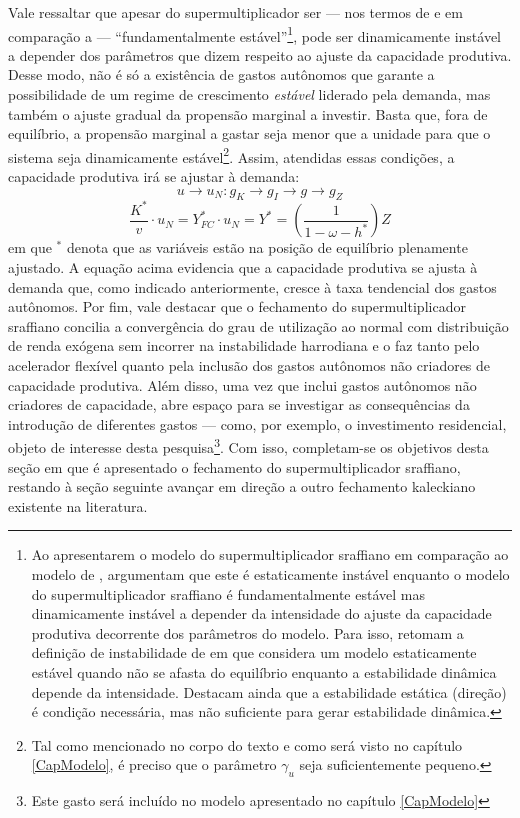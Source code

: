 Vale ressaltar que apesar do supermultiplicador ser --- nos termos de \textcite{hicks_capital_1965} e em comparação a \textcite{harrod_essay_1939} --- ``fundamentalmente estável''\footnote{
	Ao apresentarem o modelo do supermultiplicador sraffiano em comparação ao modelo de \textcite{harrod_essay_1939}, \textcite{serrano_trouble_2017} argumentam que este é estaticamente instável enquanto o modelo do supermultiplicador sraffiano é fundamentalmente estável mas dinamicamente instável a depender da intensidade do ajuste da capacidade produtiva decorrente dos parâmetros do modelo.
	Para isso, retomam a definição de instabilidade de  \textcite{hicks_capital_1965} em que considera um modelo estaticamente estável quando não se afasta do equilíbrio enquanto a estabilidade dinâmica depende da intensidade. Destacam ainda que a estabilidade estática (direção) é condição necessária, mas não suficiente para gerar estabilidade dinâmica.
}, pode ser dinamicamente instável a depender dos parâmetros que dizem respeito ao ajuste da capacidade produtiva. Desse modo, não é só a existência de gastos autônomos que garante a possibilidade de um regime de crescimento \textit{estável} liderado pela demanda, mas também o ajuste gradual da propensão marginal a investir. Basta que, fora de equilíbrio, a propensão marginal a gastar seja menor que a unidade para que o sistema seja dinamicamente estável\footnote{Tal como mencionado no corpo do texto e como será visto no capítulo \ref{CapModelo}, é preciso que o parâmetro $\gamma_u$ seja suficientemente pequeno.}. Assim, atendidas essas condições, a capacidade produtiva irá se ajustar à demanda:
$$
u \to u_N : g_K \to g_I \to g \to  g_Z
$$
$$
\frac{K^*}{v}\cdot u_N = Y_{FC}^*\cdot u_N = Y^* = \left(\frac{1}{1 - \omega - h^*}\right)Z
$$
em que $^*$ denota que as variáveis estão na posição de equilíbrio plenamente ajustado.
A equação acima evidencia que a capacidade produtiva se ajusta à demanda que, como indicado anteriormente, cresce à taxa tendencial dos gastos autônomos. 
Por fim, vale destacar que o fechamento do supermultiplicador sraffiano concilia a convergência do grau de utilização ao normal com distribuição de renda exógena sem incorrer na instabilidade harrodiana e o faz tanto pelo acelerador flexível quanto pela inclusão dos gastos autônomos não criadores de capacidade produtiva.
Além disso, uma vez que inclui gastos autônomos não criadores de capacidade, abre espaço para se investigar as consequências da introdução de diferentes gastos --- como, por exemplo, o investimento residencial, objeto de interesse desta pesquisa\footnote{
	Este gasto será incluído no modelo apresentado no capítulo \ref{CapModelo}
}.
Com isso, completam-se os objetivos desta seção em que é apresentado o fechamento do supermultiplicador sraffiano, restando à seção seguinte avançar em direção a outro fechamento kaleckiano existente na literatura.





